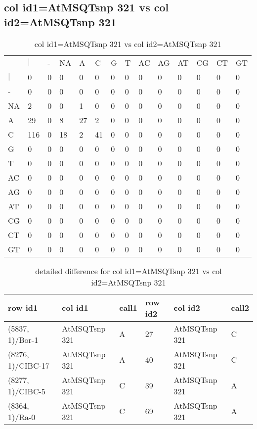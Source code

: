 \subsection{col id1=AtMSQTsnp 321 vs col id2=AtMSQTsnp 321}
\begin{center}
\begin{longtable}{|l|l|l|l|l|l|l|l|l|l|l|l|l|l|}
\caption{col id1=AtMSQTsnp 321 vs col id2=AtMSQTsnp 321} \label{table_dm662}\\
\hline
\\
\hline
&$|$&-&NA&A&C&G&T&AC&AG&AT&CG&CT&GT\\
$|$&0&0&0&0&0&0&0&0&0&0&0&0&0\\
-&0&0&0&0&0&0&0&0&0&0&0&0&0\\
NA&2&0&0&1&0&0&0&0&0&0&0&0&0\\
A&29&0&8&27&2&0&0&0&0&0&0&0&0\\
C&116&0&18&2&41&0&0&0&0&0&0&0&0\\
G&0&0&0&0&0&0&0&0&0&0&0&0&0\\
T&0&0&0&0&0&0&0&0&0&0&0&0&0\\
AC&0&0&0&0&0&0&0&0&0&0&0&0&0\\
AG&0&0&0&0&0&0&0&0&0&0&0&0&0\\
AT&0&0&0&0&0&0&0&0&0&0&0&0&0\\
CG&0&0&0&0&0&0&0&0&0&0&0&0&0\\
CT&0&0&0&0&0&0&0&0&0&0&0&0&0\\
GT&0&0&0&0&0&0&0&0&0&0&0&0&0\\
\hline
\end{longtable}
\end{center}

\begin{center}
\begin{longtable}{|l|l|l|l|l|l|}
\caption{detailed difference for col id1=AtMSQTsnp 321 vs col id2=AtMSQTsnp 321} \label{table_dm663}\\
\hline
row id1&col id1&call1&row id2&col id2&call2\\
\hline
(5837, 1)/Bor-1&AtMSQTsnp 321&A&27&AtMSQTsnp 321&C\\
(8276, 1)/CIBC-17&AtMSQTsnp 321&A&40&AtMSQTsnp 321&C\\
(8277, 1)/CIBC-5&AtMSQTsnp 321&C&39&AtMSQTsnp 321&A\\
(8364, 1)/Ra-0&AtMSQTsnp 321&C&69&AtMSQTsnp 321&A\\
\hline
\end{longtable}
\end{center}

